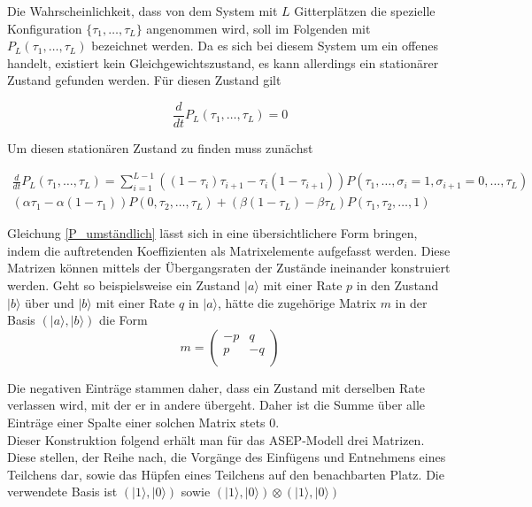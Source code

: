 \documentclass[10pt,a4paper]{report}
\begin{document}
Die Wahrscheinlichkeit, dass von dem System mit $L$ Gitterplätzen die spezielle Konfiguration $\{ \tau_1,\ldots,\tau_L \}$ angenommen wird, soll im Folgenden mit $P_L(\tau_1,\ldots,\tau_L)$ bezeichnet werden. Da es sich bei diesem System um ein offenes handelt, existiert kein Gleichgewichtszustand, es kann allerdings ein stationärer Zustand gefunden werden. Für diesen Zustand gilt

\begin{equation}
\frac{d}{dt}P_L(\tau_1,\ldots,\tau_L)=0
\end{equation}

Um diesen stationären Zustand zu finden muss zunächst 

\begin{equation}\label{P_umständlich}
\begin{split}
\frac{d}{dt}P_L(\tau_1,\ldots,\tau_L) = \sum_{i=1}^{L-1}((1-\tau_i)\tau_{i+1}-\tau_i(1-\tau_{i+1}) )P(\tau_1,\ldots,\sigma_i=1,\sigma_{i+1}=0,\ldots,\tau_L)\\
(\alpha\tau_1-\alpha(1-\tau_1)) P(0,\tau_2,\ldots,\tau_L)+(\beta(1-\tau_L)-\beta\tau_L) P(\tau_1,\tau_2,\ldots,1)
\end{split}
\end{equation}

Gleichung \ref{P_umständlich} lässt sich in eine übersichtlichere Form bringen, indem die auftretenden Koeffizienten als Matrixelemente aufgefasst werden. Diese Matrizen können mittels der Übergangsraten der Zustände ineinander konstruiert werden. Geht so beispielsweise ein Zustand $|a\rangle$ mit einer Rate $p$ in den Zustand $|b\rangle$ über und $|b\rangle$ mit einer Rate $q$ in $|a\rangle$, hätte die zugehörige Matrix $m$ in der Basis $(|a\rangle,|b\rangle)$ die Form
\begin{equation}
m=
\begin{pmatrix}
-p&q\\
p&-q\\
\end{pmatrix}
\end{equation}

Die negativen Einträge stammen daher, dass ein Zustand mit derselben Rate verlassen wird, mit der er in andere übergeht. Daher ist die Summe über alle Einträge einer Spalte einer solchen Matrix stets 0\cite{ASEP_Update}.\\

Dieser Konstruktion folgend erhält man für das ASEP-Modell drei Matrizen. Diese stellen, der Reihe nach, die Vorgänge des Einfügens und Entnehmens eines Teilchens dar, sowie das Hüpfen eines Teilchens auf den benachbarten Platz. Die verwendete Basis ist $(|1\rangle,|0\rangle)$ sowie $(|1\rangle,|0\rangle)\otimes(|1\rangle,|0\rangle)$
\end{document}
